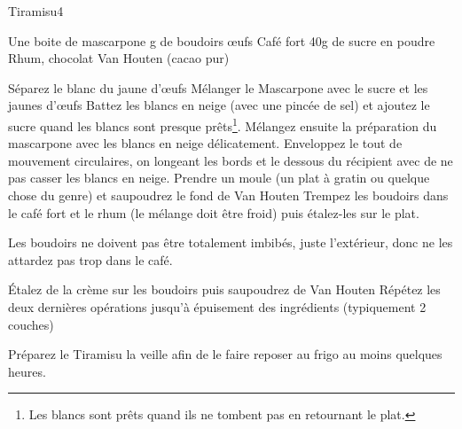 \begin{recette}{Tiramisu}{4}{}{}
\begin{ingredients}
\ingredient Une boite de mascarpone
 g de boudoirs
 œufs
\ingredient Café fort
\ingredient 40g de sucre en poudre
\ingredient Rhum, chocolat Van Houten (cacao pur)
\end{ingredients}

\begin{preparation}
\etape Séparez le blanc du jaune d'œufs
\etape Mélanger le Mascarpone avec le sucre et les jaunes d'œufs
\etape Battez les blancs en neige (avec une pincée de sel) et ajoutez le sucre quand les blancs sont presque prêts\footnote{Les blancs sont prêts quand ils ne tombent pas en retournant le plat.}.
\etape Mélangez ensuite la préparation du mascarpone avec les blancs en neige délicatement. Enveloppez le tout de mouvement circulaires, on longeant les bords et le dessous du récipient avec de ne pas casser les blancs en neige.
\etape Prendre un moule (un plat à gratin ou quelque chose du genre) et saupoudrez le fond de Van Houten
\etape Trempez les boudoirs dans le café fort et le rhum (le mélange doit être froid) puis étalez-les sur le plat.
\begin{remarque}
Les boudoirs ne doivent pas être totalement imbibés, juste l'extérieur, donc ne les attardez pas trop dans le café.
\end{remarque}
\etape Étalez de la crème sur les boudoirs puis saupoudrez de Van Houten
\etape Répétez les deux dernières opérations jusqu'à épuisement des ingrédients (typiquement 2 couches)
\end{preparation}

\begin{remarque}
Préparez le Tiramisu la veille afin de le faire reposer au frigo au moins quelques heures.
\end{remarque}
\end{recette}

